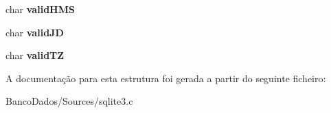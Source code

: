 \begin{DoxyCompactItemize}
\item 
\hypertarget{struct_date_time_aba26b32c6142cf6bfc09db3088b90add}{char {\bfseries valid\-H\-M\-S}}\label{struct_date_time_aba26b32c6142cf6bfc09db3088b90add}

\item 
\hypertarget{struct_date_time_a1962742892150a03dc5d302f43efbb04}{char {\bfseries valid\-J\-D}}\label{struct_date_time_a1962742892150a03dc5d302f43efbb04}

\item 
\hypertarget{struct_date_time_af3dfda2bdbb2183dc1b94f449701b81e}{char {\bfseries valid\-T\-Z}}\label{struct_date_time_af3dfda2bdbb2183dc1b94f449701b81e}

\end{DoxyCompactItemize}


A documentação para esta estrutura foi gerada a partir do seguinte ficheiro\-:\begin{DoxyCompactItemize}
\item 
Banco\-Dados/\-Sources/sqlite3.\-c\end{DoxyCompactItemize}
